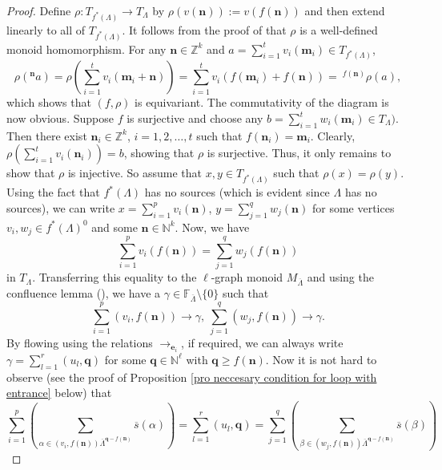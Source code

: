 \documentclass[a4paper,reqno,12pt]{amsart}
\numberwithin{equation}{section}
\theoremstyle{definition}
\theoremstyle{remark}
\newcommand{\N}{\mathbf{n}}
\newcommand{\M}{\mathbf{m}}
\newcommand{\Q}{\mathbf{q}}
\begin{document}
\begin{proof}
Define $\rho:T_{f^*(\Lambda)}\longrightarrow T_\Lambda$ by $\rho(v(\N)):=v(f(\N))$ and then extend linearly to all of $T_{f^*(\Lambda)}$. It follows from the proof of \cite[Proposition 4.8(ii)]{HMPS2} that $\rho$ is a well-defined monoid homomorphism. For any $\N\in \mathbb{Z}^k$ and $a=\displaystyle{\sum_{i=1}^{t}}v_i(\M_i)\in T_{f^*(\Lambda)}$, \[\rho(^\N a)=\rho\left(\displaystyle{\sum_{i=1}^{t}} v_i(\M_i+\N)\right)=\displaystyle{\sum_{i=1}^{t}}v_i(f(\M_i)+f(\N))=~^{f(\N)}\rho(a),\] which shows that $(f,\rho)$ is equivariant. The commutativity of the diagram is now obvious. Suppose $f$ is surjective and choose any $b=\displaystyle{\sum_{i=1}^{t}}w_i(\M_i)\in T_\Lambda)$. Then there exist $\N_i\in \mathbb{Z}^k$, $i=1,2,\ldots,t$ such that $f(\N_i)=\M_i$. Clearly, $\rho\left(\displaystyle{\sum_{i=1}^{t}} v_i(\N_i)\right)=b$, showing that $\rho$ is surjective. Thus, it only remains to show that $\rho$ is injective. So assume that $x,y\in T_{f^*(\Lambda)}$ such that $\rho(x)=\rho(y)$. Using the fact that $f^*(\Lambda)$ has no sources (which is evident since $\Lambda$ has no sources), we can write $x=\displaystyle{\sum_{i=1}^{p}} v_i(\N)$, $y=\displaystyle{\sum_{j=1}^{q}}w_j(\N)$ for some vertices $v_i,w_j\in f^*(\Lambda)^0$ and some $\N\in \mathbb{N}^k$. Now, we have 
\begin{equation*}
\displaystyle{\sum_{i=1}^{p}}v_i(f(\N))=\displaystyle{\sum_{j=1}^{q}}w_j(f(\N))
\end{equation*}
in $T_\Lambda$. Transferring this equality to the $\ell$-graph monoid $M_{\overline{\Lambda}}$ and using the confluence lemma (\cite[Lemma 3.5]{HMPS1}), we have a $\gamma\in \mathbb{F}_{\overline{\Lambda}}\setminus \{0\}$ such that \[\displaystyle{\sum_{i=1}^{p}}(v_i,f(\N))\longrightarrow \gamma,~\displaystyle{\sum_{j=1}^{q}}(w_j,f(\N))\longrightarrow \gamma.\] By flowing using the relations $\longrightarrow_{\mathbf{e}_i}$, if required, we can always write $\gamma=\displaystyle{\sum_{l=1}^{r}} (u_l,\Q)$ for some $\Q\in \mathbb{N}^\ell$ with $\Q\ge f(\N)$. Now it is not hard to observe (see the proof of Proposition \ref{pro neccesary condition for loop with entrance} below) that 
\begin{equation}\label{eq triple}
\displaystyle{\sum_{i=1}^{p}}\left(\displaystyle{\sum_{\alpha\in (v_i,f(\N))\overline{\Lambda}^{\Q-f(\N)}}}\overline{s}(\alpha)\right)=\displaystyle{\sum_{l=1}^{r}} (u_l,\Q)=\displaystyle{\sum_{j=1}^{q}}\left(\displaystyle{\sum_{\beta\in (w_j,f(\N))\overline{\Lambda}^{\Q-f(\N)}}}\overline{s}(\beta)\right)

\end{equation}
\end{proof}
\end{document}
